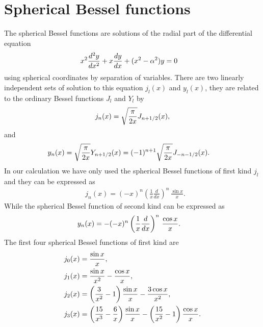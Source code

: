 \section{Spherical Bessel functions}
\label{app:bess}
The spherical Bessel functions are solutions of the radial part of the differential equation
\begin{align}
		  &  x^2 \frac{d^2 y}{dx^2} + x \frac{dy}{dx} + (x^2 - \alpha^2)y = 0\notag
\end{align}
using spherical coordinates by separation of variables.
There are two linearly independent sets of solution to this equation $j_l(x)$ and $y_l(x)$, they are related to the ordinary Bessel functions $J_l$ and $Y_l$ by
\begin{align}
		&     j_{n}(x) = \sqrt{\frac{\pi}{2x}} J_{n+1/2}(x),\notag\\
\end{align}
and
\begin{align}
		&    y_{n}(x) = \sqrt{\frac{\pi}{2x}} Y_{n+1/2}(x) = (-1)^{n+1} \sqrt{\frac{\pi}{2x}} J_{-n-1/2}(x).\notag
\end{align}
In our calculation we have only used the spherical Bessel functions of first kind $j_l$ and they can be expressed as
\begin{align}
		&   j_n(x) = (-x)^n \left(\frac{1}{x}\frac{d}{dx}\right)^n\,\frac{\sin x}{x}.
\end{align}
While the spherical Bessel function of second kind can be expressed as 
\begin{align}
		&    y_n(x) = -(-x)^n \left(\frac{1}{x}\frac{d}{dx}\right)^n\,\frac{\cos x}{x}.\notag
\end{align}
The first four spherical Bessel functions of first kind are 
\begin{align}
&	j_0(x)=\frac{\sin x} {x}, \notag \\
&	j_1(x)=\frac{\sin x} {x^2}- \frac{\cos x} {x},\notag\\
&    j_2(x)=\left(\frac{3} {x^2} - 1 \right)\frac{\sin x}{x} - \frac{3\cos x} {x^2},\notag\\
&	j_3(x)=\left(\frac{15}{x^3} - \frac{6}{x} \right)\frac{\sin x}{x} -\left(\frac{15}{x^2} - 1\right) \frac{\cos x} {x}. \notag
\end{align}
